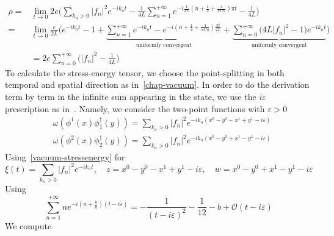 \begin{equation*}
\begin{split}
\rho =& \lim_{t\rightarrow 0} 2e \bigg(\sum_{k_n>0} |f_n|^2 e^{-ik_nt} 
- \frac{ 1}{ 4L}\sum_{n=1}^{+\infty} e^{-i\frac{1}{2L}(n+\frac 1 2 + \frac{4}{\pi C n}) \pi t} - \frac{1}{4L} \bigg) \\
%
= & \lim_{t\rightarrow 0 }\frac{e}{2L}\Big( e^{-ik_0t} - 1 +
\underbrace{ \sum_{n=1}^{+\infty}e^{-ik_nt} - e^{-i(n+\frac 1 2 + \frac{4}{\pi C n} )\frac{\pi t}{2L}} }_{\textrm{uniformly convergent}} 
+\underbrace{\sum_{n=0}^{+\infty}\big(4 L  |f_n|^2 -1 \big) e^{-ik_nt}}_{\textrm{uniformly convergent}}
\Big) \\
& = 2e \sum_{n=0}^{+\infty}\big(|f_n|^2 -\frac{1}{4L} \big)
\end{split}
\end{equation*}
%
To calculate the stress-energy tensor, we choose the point-splitting in both temporal and spatial direction as in~\cref{chap-vacuum}. 
In order to do the derivation term by term in the infinite sum appearing in the state, we use the $i\varepsilon$ prescription as in~\cite{Zahn2017}. 
Namely, we consider the two-point functions with $\varepsilon >0$
\begin{equation*}
\begin{split}
& \omega(\phi^1(x)\phi_1^\dagger(y)) = 
 \sum_{k_n>0} |f_n|^2 e^{-ik_n(x^0 - y^0 - x^1 + y^1-i\varepsilon)} \\
& \omega(\phi^2(x)\phi_2^\dagger(y)) =
\sum_{k_n>0} |f_n|^2 e^{-ik_n(x^0 - y^0 + x^1 - y^1-i\varepsilon)}
\end{split}
\end{equation*}
%
Using~\cref{vacuum-stressenergy} for 
\begin{equation*}
\xi(t) = \sum_{k_n>0} |f_n|^2 e^{-ik_n t} ,  \quad
z = x^0 - y^0 - x^1 + y^1-i\varepsilon  ,\quad
w = x^0 - y^0 + x^1 - y^1-i\varepsilon
\end{equation*}
Using
\begin{equation*}
\sum_{n=1}^{+\infty} n e^{-i(n+\frac b n )(t - i\varepsilon)}
= -\frac{1}{(t-i\varepsilon)^2} - \frac{1}{12}-b + \mathcal{O}(t-i\varepsilon)
\end{equation*}
We compute
